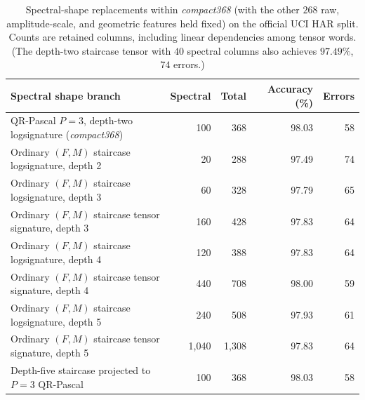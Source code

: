\begin{table}[ht]
\centering
\begin{tabular}{@{}lrrrr@{}}
\toprule
Spectral shape branch & Spectral & Total & Accuracy (\%) & Errors \\
\midrule
QR-Pascal \(P=3\), depth-two logsignature (\emph{compact368}) & 100 & 368 & 98.03 & 58 \\
Ordinary \((F,M)\) staircase logsignature, depth 2 & 20 & 288 & 97.49 & 74 \\
Ordinary \((F,M)\) staircase logsignature, depth 3 & 60 & 328 & 97.79 & 65 \\
Ordinary \((F,M)\) staircase tensor signature, depth 3 & 160 & 428 & 97.83 & 64 \\
Ordinary \((F,M)\) staircase logsignature, depth 4 & 120 & 388 & 97.83 & 64 \\
Ordinary \((F,M)\) staircase tensor signature, depth 4 & 440 & 708 & 98.00 & 59 \\
Ordinary \((F,M)\) staircase logsignature, depth 5 & 240 & 508 & 97.93 & 61 \\
Ordinary \((F,M)\) staircase tensor signature, depth 5 & 1,040 & 1,308 & 97.83 & 64 \\
\midrule
Depth-five staircase projected to \(P=3\) QR-Pascal & 100 & 368 & 98.03 & 58 \\
\bottomrule
\end{tabular}
\caption{Spectral-shape replacements within \emph{compact368} (with the other
\(268\) raw, amplitude-scale, and geometric features held fixed) on the official
UCI HAR split. Counts are retained columns, including linear dependencies among
tensor words. (The depth-two staircase tensor with \(40\) spectral columns also
achieves \(97.49\%\), \(74\) errors.)}
\label{tab:ordinary-spectral}
\end{table}

